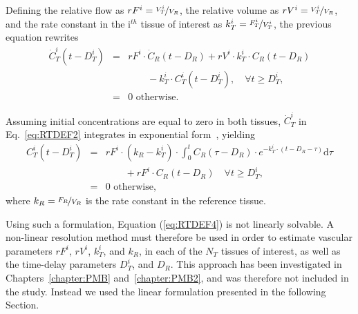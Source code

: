 Defining the relative flow as $rF^i = \nicefrac{V_T^i}{V_R}$, the relative volume as $rV^i = \nicefrac{V_T^i}{V_R}$, and the rate constant in the i$^{th}$ tissue of interest as $k_T^i = \nicefrac{F_T^i}{V_T^i}$, the previous equation rewrites
\begin{equation}
\begin{array}{rcl}
\dot{C}_T^i \left(t - D_T^i\right) &= & rF^i \cdot \dot{C}_{R}\left(t-D_R\right) + rV^i \cdot k_T^i \cdot C_{R} \left(t - D_{R}\right) \\
& & \qquad - k_T^i \cdot C_{T}^i \left( t - D_{T}^i \right), \quad \forall t \geq D_T^i,\\
&=& \textrm{0 otherwise.}
\end{array}
\label{eq:RTDEF2}
\end{equation}

Assuming initial concentrations are equal to zero in both tissues, $\dot{C}_T^i$ in Eq.~\ref{eq:RTDEF2} integrates in exponential form~\cite{Yankeelov2005de}, yielding
\begin{equation}
\begin{array}{rcl}
C_T^i \left( t - D_T^i \right) & = & rF^i \cdot \left( k_R - k_T^i \right) \cdot \int_{0}^{t} C_{R} \left( \tau - D_R \right) \cdot e^{- k_T^i \cdot \left( t - D_R - \tau \right)} \mathrm d \tau \\
& & \qquad + rF^i \cdot C_{R} \left( t - D_R \right) \quad \forall t \geq D_T^i, \\
&=& \textrm{0 otherwise,}
\end{array}
\label{eq:RTDEF4}
\end{equation}
where $k_R = \nicefrac{F_R}{V_R}$ is the rate constant in the reference tissue.

Using such a formulation, Equation (\ref{eq:RTDEF4}) is not linearly solvable. 
A non-linear resolution method must therefore be used in order to estimate vascular parameters $rF^i$, $rV^i$, $k_T^i$, and $k_R$, in each of the $N_T$ tissues of interest, as well as the time-delay parameters $D_T^i$, and $D_R$.
This approach has been investigated in Chapters~\ref{chapter:PMB} and~\ref{chapter:PMB2}, and was therefore not included in the study. 
Instead we used the linear formulation presented in the following Section.

